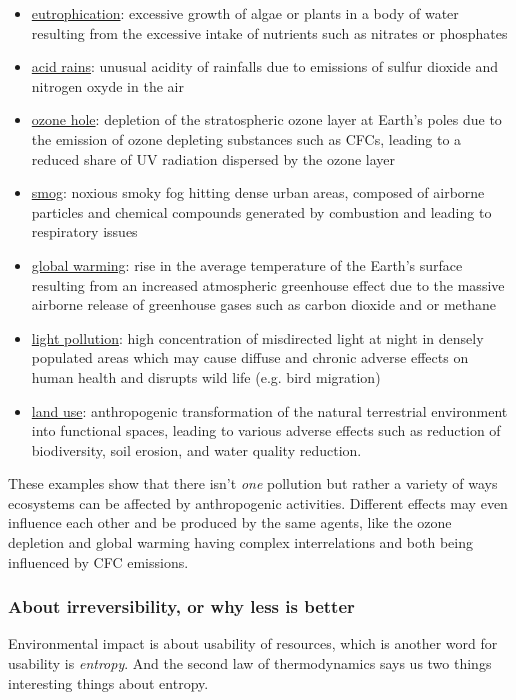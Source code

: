 \documentclass{article}
\begin{document}
\begin{itemize} %
	\item \href{https://en.wikipedia.org/wiki/Eutrophication}{eutrophication}: excessive growth of algae or plants in a body of water resulting from the excessive intake of nutrients such as nitrates or phosphates
	\item \href{https://en.wikipedia.org/wiki/Acid_rain}{acid rains}: unusual acidity of rainfalls due to emissions of sulfur dioxide and nitrogen oxyde in the air
	\item \href{https://en.wikipedia.org/wiki/Ozone_depletion}{ozone hole}: depletion of the stratospheric ozone layer at Earth's poles due to the emission of ozone depleting substances such as CFCs, leading to a reduced share of UV radiation dispersed by the ozone layer
	\item \href{https://en.wikipedia.org/wiki/Smog}{smog}: noxious smoky fog hitting dense urban areas, composed of airborne particles and chemical compounds generated by combustion and leading to respiratory issues
	\item \href{https://en.wikipedia.org/wiki/Global_warming}{global warming}: rise in the average temperature of the Earth's surface resulting from an increased atmospheric greenhouse effect due to the massive airborne release of greenhouse gases such as carbon dioxide and or methane
	\item \href{https://en.wikipedia.org/wiki/Light_pollution}{light pollution}: high concentration of misdirected light at night in densely populated areas which may cause diffuse and chronic adverse effects on human health and disrupts wild life (e.g. bird migration) 
	\item \href{https://en.wikipedia.org/wiki/Land_use}{land use}: anthropogenic transformation of the natural terrestrial environment into functional spaces, leading to various adverse effects such as reduction of biodiversity, soil erosion, and water quality reduction. 
\end{itemize}
These examples show that there isn't \emph{one} pollution but rather a variety of ways ecosystems can be affected by anthropogenic activities. Different effects may even influence each other and be produced by the same agents, like the ozone depletion and global warming having complex interrelations and both being influenced by CFC emissions. 

\subsubsection{About irreversibility, or why less is better}
\label{sec:irreversibility}
Environmental impact is about usability of resources, which is another word for usability is \emph{entropy}. And the second law of thermodynamics says us two things interesting things about entropy.
\end{document}
